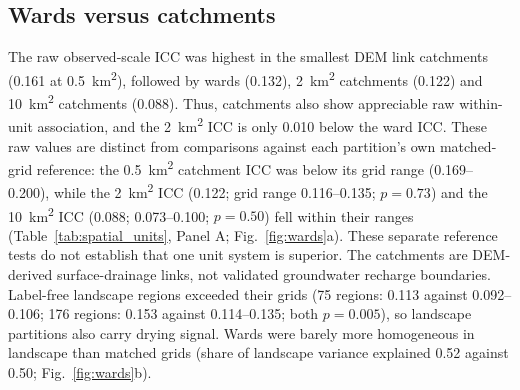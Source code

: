 \documentclass[preprint,12pt,authoryear]{elsarticle}
\begin{document}
\subsection{Wards versus catchments}\label{sec:res-wards}
The raw observed-scale ICC was highest in the smallest DEM link catchments (0.161 at \SI{0.5}{\kilo\metre\squared}), followed by wards (0.132), \SI{2}{\kilo\metre\squared} catchments (0.122) and \SI{10}{\kilo\metre\squared} catchments (0.088). Thus, catchments also show appreciable raw within-unit association, and the \SI{2}{\kilo\metre\squared} ICC is only 0.010 below the ward ICC. These raw values are distinct from comparisons against each partition's own matched-grid reference: the \SI{0.5}{\kilo\metre\squared} catchment ICC was below its grid range (0.169--0.200), while the \SI{2}{\kilo\metre\squared} ICC (0.122; grid range 0.116--0.135; $p = 0.73$) and the \SI{10}{\kilo\metre\squared} ICC (0.088; 0.073--0.100; $p = 0.50$) fell within their ranges (Table~\ref{tab:spatial_units}, Panel A; Fig.~\ref{fig:wards}a). These separate reference tests do not establish that one unit system is superior. The catchments are DEM-derived surface-drainage links, not validated groundwater recharge boundaries. Label-free landscape regions exceeded their grids (75 regions: 0.113 against 0.092--0.106; 176 regions: 0.153 against 0.114--0.135; both $p = 0.005$), so landscape partitions also carry drying signal. Wards were barely more homogeneous in landscape than matched grids (share of landscape variance explained 0.52 against 0.50; Fig.~\ref{fig:wards}b).
\end{document}

